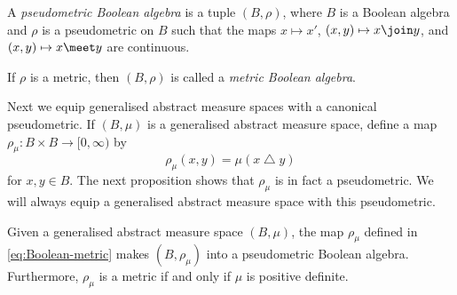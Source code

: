 \documentclass[article, a4paper, 11pt, oneside]{memoir}
\numberwithin{equation}{chapter}
\renewcommand{\symdiff}{\mathbin{\triangle}}
\begin{document}
\begin{definition}
    A \emph{pseudometric Boolean algebra} is a tuple $(B,\rho)$, where $B$ is a Boolean algebra and $\rho$ is a pseudometric on $B$ such that the maps $x \mapsto x'$, $(x,y) \mapsto x \join y$, and $(x,y) \mapsto x \meet y$ are continuous.

    If $\rho$ is a metric, then $(B,\rho)$ is called a \emph{metric Boolean algebra}.
\end{definition}

Next we equip generalised abstract measure spaces with a canonical pseudometric. If $(B,\mu)$ is a generalised abstract measure space, define a map $\rho_\mu \colon B \times B \to [0,\infty)$ by
%
\begin{equation}
    \label{eq:Boolean-metric}
    \rho_\mu(x,y)
        = \mu(x \symdiff y)
\end{equation}
%
for $x,y \in B$. The next proposition shows that $\rho_\mu$ is in fact a pseudometric. We will always equip a generalised abstract measure space with this pseudometric.

\begin{proposition}
    Given a generalised abstract measure space $(B,\mu)$, the map $\rho_\mu$ defined in \eqref{eq:Boolean-metric} makes $(B,\rho_\mu)$ into a pseudometric Boolean algebra. Furthermore, $\rho_\mu$ is a metric if and only if $\mu$ is positive definite.
\end{proposition}

\newcommand{\mylistlabelfont}[1]{{\normalfont\color{linkcolor}\textit{#1}:}}
\end{document}
